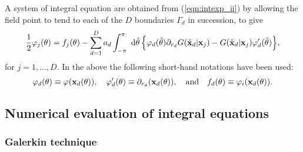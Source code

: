 \documentclass[12pt,a4paper]{article}
\newcommand{\wrt}{ ~ {\rm d}}
\newcommand{\vph}{{\varphi}}
\newcommand{\vpr}{{\varphi}}
\newcommand{\bdy}{\Gamma}
\newcommand{\rad}{a}
\newcommand{\xo}{\check{x}}
\newcommand{\yo}{\check{y}}
\newcommand{\bx}{{\bf x}}
\newcommand{\bxo}{\check{\textbf{x}}}
\newcommand{\tho}{\check{\theta}}
\newcommand{\force}{f}
\begin{document}
A system of integral equation are obtained from (\ref{eqn:intexp_ii}) by allowing the field point to tend to each of the $D$ boundaries $\bdy_{d}$ in succession, to give
\begin{equation}\label{eqn:IEsys}
\frac12
\vpr_{j}(\theta)
=
\force_{j}(\theta)
-
\sum_{d=1}^{D}
\rad_{d}
\int_{-\pi}^{\pi}
\wrt \tho\,
\Big\{
\vpr_{d}(\tho)
\partial_{r_{d}}
G(\bxo_{d}\vert \bx_{j})
-
G(\bxo_{d}\vert \bx_{j})
\vpr'_{d}(\tho)
\Big\}
,
\end{equation}
for $j=1,\dots,D$.
In the above the following short-hand notations have been used:
\begin{equation}
\vpr_{d}(\theta) \equiv \vph(\bx_{d}(\theta)),
\quad
\vpr'_{d}(\theta) \equiv \partial_{r_{d}}(\bx_{d}(\theta)),
\quad
\text{and}
\quad
\force_{d}(\theta) \equiv \vph_{i}(\bx_{d}(\theta)).
\end{equation}


\subsection{Numerical evaluation of integral equations}


\subsubsection{Galerkin technique}
\end{document}
